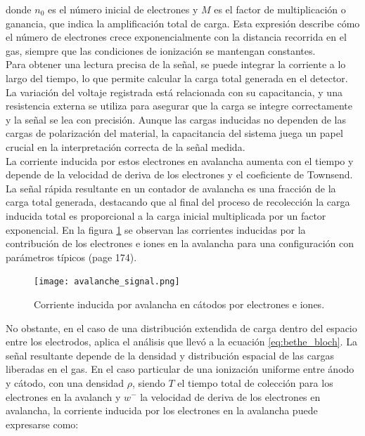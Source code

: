 \documentclass{article}
\begin{document}
\noindent donde \(n_0\) es el número inicial de electrones y \(M\) es el factor de multiplicación o ganancia, que indica la amplificación total de carga. Esta expresión describe cómo el número de electrones crece exponencialmente con la distancia recorrida en el gas, siempre que las condiciones de ionización se mantengan constantes.\\

\noindent Para obtener una lectura precisa de la señal, se puede integrar la corriente a lo largo del tiempo, lo que permite calcular la carga total generada en el detector. La variación del voltaje registrada está relacionada con su capacitancia, y una resistencia externa se utiliza para asegurar que la carga se integre correctamente y la señal se lea con precisión. Aunque las cargas inducidas no dependen de las cargas de polarización del material, la capacitancia del sistema juega un papel crucial en la interpretación correcta de la señal medida.\\

\noindent La corriente inducida por estos electrones en avalancha aumenta con el tiempo y depende de la velocidad de deriva de los electrones y el coeficiente de Townsend. La señal rápida resultante en un contador de avalancha es una fracción de la carga total generada, destacando que al final del proceso de recolección la carga inducida total es proporcional a la carga inicial multiplicada por un factor exponencial. En la figura \ref{fig:avalanche_signal} se observan las corrientes inducidas por la contribución de los electrones e iones en la avalancha para una configuración con parámetros típicos (page 174).

\begin{figure}[H]
    \centering
    \texttt{[image: avalanche\_signal.png]}
    \caption{Corriente inducida por avalancha en cátodos por electrones e iones.}
    \label{fig:avalanche_signal}
\end{figure}

\noindent No obstante, en el caso de una distribución extendida de carga dentro del espacio entre los electrodos, aplica el análisis que llevó a la ecuación \ref{eq:bethe_bloch}. La señal resultante depende de la densidad y distribución espacial de las cargas liberadas en el gas. En el caso particular de una ionización uniforme entre ánodo y cátodo, con una densidad \( \rho \), siendo $T$ el tiempo total de colección para los electrones en la avalanch y $w^-$ la velocidad de deriva de los electrones en avalancha, la corriente inducida por los electrones en la avalancha puede expresarse como:
\end{document}
